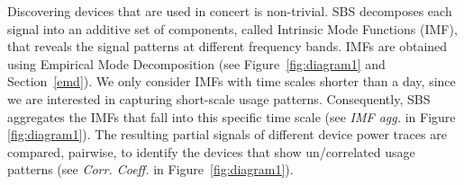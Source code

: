 Discovering devices that are used in concert is non-trivial.  
SBS decomposes each signal into an additive set of components, called Intrinsic Mode Functions (IMF), 
that reveals the signal patterns at different frequency bands.  IMFs are obtained using 
Empirical Mode Decomposition (see Figure~\ref{fig:diagram1} and Section~\ref{emd}).
We only consider IMFs with time scales shorter than a day, since we are interested in capturing short-scale usage patterns.
Consequently, SBS aggregates the IMFs that fall into this specific time scale (see \emph{IMF agg.} in Figure \ref{fig:diagram1}).
The resulting partial signals of different device power traces are compared, pairwise, to identify the devices that show un/correlated usage patterns (see \emph{Corr. Coeff.} in Figure~\ref{fig:diagram1}).


% 
% 




